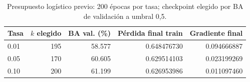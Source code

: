 \begin{table}[htbp]
\centering\small
\caption{Presupuesto logístico previo: 200 épocas por tasa; checkpoint elegido por BA de validación a umbral 0,5.}\label{tab:tasas}
\begin{tabular}{lrrrr}\toprule
Tasa & $k$ elegido & BA val. (\%) & Pérdida final train & Gradiente final \\ \midrule
0.01 & 195 & 58.577 & 0.648476730 & 0.094666887 \\
0.05 & 170 & 60.605 & 0.629514103 & 0.023199269 \\
0.10 & 200 & 61.199 & 0.626953986 & 0.011097460 \\
\bottomrule\end{tabular}
\end{table}
